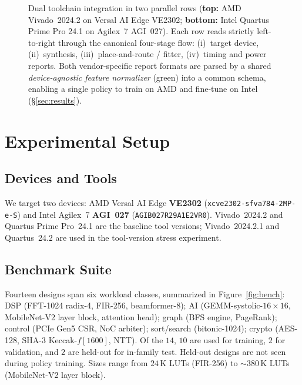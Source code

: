 \documentclass[journal,onecolumn=false]{IEEEtran}
\begin{document}
\begin{figure}[t]
\begin{tikzpicture}[font=\sffamily, every node/.style={inner sep=0pt}]
\end{tikzpicture}
\caption{Dual toolchain integration in two parallel rows (\textbf{top:} AMD Vivado~2024.2 on Versal AI Edge VE2302; \textbf{bottom:} Intel Quartus Prime Pro 24.1 on Agilex~7 AGI~027). Each row reads strictly left-to-right through the canonical four-stage flow: (i)~target device, (ii)~synthesis, (iii)~place-and-route / fitter, (iv)~timing and power reports. Both vendor-specific report formats are parsed by a shared \emph{device-agnostic feature normalizer} (green) into a common schema, enabling a single policy to train on AMD and fine-tune on Intel (\S\ref{sec:results}).}
\label{fig:toolflow}
\end{figure}

\section{Experimental Setup}
\label{sec:setup}

\subsection{Devices and Tools}
We target two devices: AMD Versal AI Edge \textbf{VE2302} (\texttt{xcve2302-sfva784-2MP-e-S}) and Intel Agilex~7 \textbf{AGI~027} (\texttt{AGIB027R29A1E2VR0}). Vivado~2024.2 and Quartus Prime Pro~24.1 are the baseline tool versions; Vivado~2024.2.1 and Quartus~24.2 are used in the tool-version stress experiment.

\subsection{Benchmark Suite}
Fourteen designs span six workload classes, summarized in Figure~\ref{fig:bench}: DSP (FFT-1024 radix-4, FIR-256, beamformer-8); AI (GEMM-systolic-$16{\times}16$, MobileNet-V2 layer block, attention head); graph (BFS engine, PageRank); control (PCIe Gen5 CSR, NoC arbiter); sort/search (bitonic-1024); crypto (AES-128, SHA-3 Keccak-$f[1600]$, NTT). Of the $14$, $10$ are used for training, $2$ for validation, and $2$ are held-out for in-family test. Held-out designs are not seen during policy training. Sizes range from $24$\,K LUTs (FIR-256) to $\sim 380$\,K LUTs (MobileNet-V2 layer block).
\end{document}
